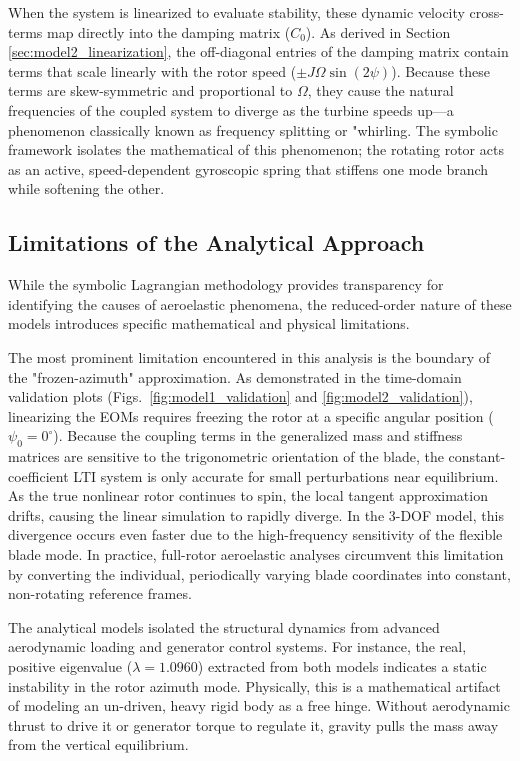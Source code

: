 \documentclass[final,onecolumn]{IEEEtran}
\begin{document}
When the system is linearized to evaluate stability, these dynamic velocity cross-terms map directly into the damping matrix ($C_0$). As derived in Section \ref{sec:model2_linearization}, the off-diagonal entries of the damping matrix contain terms that scale linearly with the rotor speed ($\pm J\Omega\sin(2\psi)$). Because these terms are skew-symmetric and proportional to $\Omega$, they cause the natural frequencies of the coupled system to diverge as the turbine speeds up—a phenomenon classically known as frequency splitting or "whirling. The symbolic framework isolates the mathematical of this phenomenon; the rotating rotor acts as an active, speed-dependent gyroscopic spring that stiffens one mode branch while softening the other.

\subsection{Limitations of the Analytical Approach}
\label{sec:discussion_limitations}

While the symbolic Lagrangian methodology provides transparency for identifying the causes of aeroelastic phenomena, the reduced-order nature of these models introduces specific mathematical and physical limitations.

The most prominent limitation encountered in this analysis is the boundary of the "frozen-azimuth" approximation. As demonstrated in the time-domain validation plots (Figs.~\ref{fig:model1_validation} and \ref{fig:model2_validation}), linearizing the EOMs requires freezing the rotor at a specific angular position ($\psi_0 = 0^\circ$). Because the coupling terms in the generalized mass and stiffness matrices are sensitive to the trigonometric orientation of the blade, the constant-coefficient LTI system is only accurate for small perturbations near equilibrium. As the true nonlinear rotor continues to spin, the local tangent approximation drifts, causing the linear simulation to rapidly diverge. In the 3-DOF model, this divergence occurs even faster due to the high-frequency sensitivity of the flexible blade mode. In practice, full-rotor aeroelastic analyses circumvent this limitation by converting the individual, periodically varying blade coordinates into constant, non-rotating reference frames.

The analytical models isolated the structural dynamics from advanced aerodynamic loading and generator control systems. For instance, the real, positive eigenvalue ($\lambda = 1.0960$) extracted from both models indicates a static instability in the rotor azimuth mode. Physically, this is a mathematical artifact of modeling an un-driven, heavy rigid body as a free hinge. Without aerodynamic thrust to drive it or generator torque to regulate it, gravity pulls the mass away from the vertical equilibrium.
\end{document}
